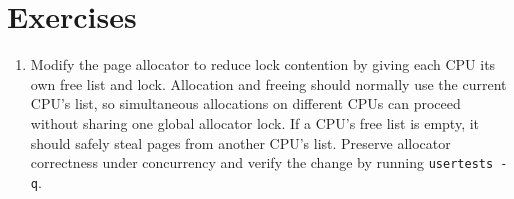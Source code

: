 \section{Exercises}

\begin{enumerate}

\item Modify the page allocator to reduce lock contention by giving each
CPU its own free list and lock. Allocation and freeing should normally
use the current CPU's list, so simultaneous allocations on different CPUs
can proceed without sharing one global allocator lock. If a CPU's free
list is empty, it should safely steal pages from another CPU's list.
Preserve allocator correctness under concurrency and verify the change by
running \texttt{usertests -q}.

\end{enumerate}


